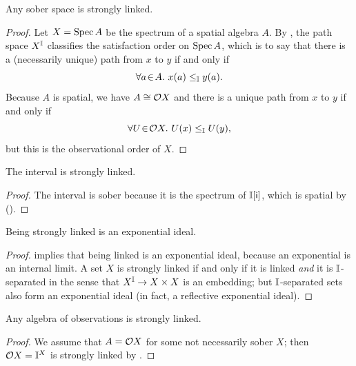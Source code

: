 \begin{lemma}[\AxiomSQCP]\label{lem:sober-strongly-linked}
  Any sober space is strongly linked.
\end{lemma}

\begin{proof}
  Let $X=\operatorname{Spec}{A}$ be the spectrum of a spatial algebra $A$. 
  By , the path space $X^{\mathbb{I}}$ classifies the satisfaction order on $\operatorname{Spec}{A}$, which is to say that there is a (necessarily unique) path from $x$ to $y$ if and only if \[\forall a\!\in\!A.\  x(a)\le_{\mathbb{I}} y(a)\text{.}\] Because $A$ is spatial, we have $A\cong \mathcal{O} X$ and there is a unique path from $x$ to $y$ if and only if \[\forall U\!\in\!\mathcal{O}{X}.\  U(x)\le_{\mathbb{I}} U(y)\text{,}\] but this is the observational order of $X$.
\end{proof}

\begin{lemma}[\AxiomSQCP]\label{lem:int-strong-link}
  The interval is strongly linked.
\end{lemma}

\begin{proof}
  The interval is sober because it is the spectrum of $\mathbb{I}[\mathsf{i}]$, which is spatial by (\AxiomSQCP).
\end{proof}

\begin{lemma}\label{lem:strong-link-exp-ideal}
  Being strongly linked is an exponential ideal.
\end{lemma}

\begin{proof}
  \citet[Prop.\ 5.4.4]{PhoaWesleyKym-Son1991DtiR} implies that being linked is an exponential ideal, because an exponential is an internal limit. A set $X$ is strongly linked if and only if it is linked \emph{and} it is $\mathbb{I}$-separated in the sense that $X^{\mathbb{I}}\to X\times X$ is an embedding; but $\mathbb{I}$-separated sets also form an exponential ideal (in fact, a reflective exponential ideal).
\end{proof}

\begin{lemma}[\AxiomSQCP]\label{lem:O-strongly-linked}
  Any algebra of observations is strongly linked.
\end{lemma}

\begin{proof}
  We assume that $A=\mathcal{O}{X}$ for some not necessarily sober $X$; then $\mathcal{O}{X}=\mathbb{I}^X$ is strongly linked by .
\end{proof}


